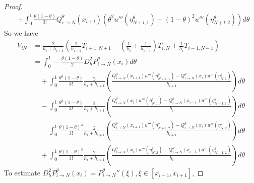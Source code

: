\documentclass[review,supplement,hidelinks,onefignum,onetabnum]{siamart220329}
\begin{document}
\begin{proof}
\begin{equation}
\begin{aligned}
              & + \int_{0}^{1} \frac{\theta (1-\theta)}{3!}{Q_{i\to N}^\theta}(x_{i+l})( \theta^2  u'''(\eta_{N+l, 1}^\theta) - (1-\theta)^2 u'''(\eta_{N+l, 2}^\theta)) d\theta
    \end{aligned}
  \end{equation}
  So we have
  \begin{equation}
    \begin{aligned}
      V_{iN} & = \frac{2}{h_{i} + h_{i+1}}  \left( \frac{1}{h_{i+1}} T_{i+1, N+1} - \left(\frac{1}{h_{i}}+\frac{1}{h_{i+1}}\right)  T_{i,N} + \frac{1}{h_{i}} T_{i-1, N-1} \right)                                                      \\
             & = \int_{0}^{1} -\frac{\theta (1-\theta)}{2} D_h^2 P_{i\to N}^\theta(x_i)  d\theta                                                                                                                                           \\
             & \quad +  \int_{0}^1 \frac{\theta^3 (1-\theta)}{3!} \frac{2}{h_{i} + h_{i+1}}\left( \frac{{Q_{i\to N}^\theta}(x_{i+1}) u'''(\eta_{N+1,1}^\theta) - {Q_{i\to N}^\theta}(x_{i}) u'''(\eta_{N,1}^\theta)}{h_{i+1}}\right)  d\theta \\
             & \quad -  \int_{0}^1 \frac{\theta^3 (1-\theta)}{3!} \frac{2}{h_{i} + h_{i+1}}\left( \frac{{Q_{i\to N}^\theta}(x_{i}) u'''(\eta_{N,1}^\theta) - {Q_{i\to N}^\theta}(x_{i-1}) u'''(\eta_{N-1,1}^\theta)}{h_{i}}\right)  d\theta   \\
             & \quad -  \int_{0}^1 \frac{\theta (1-\theta)^3}{3!} \frac{2}{h_{i} + h_{i+1}}\left( \frac{{Q_{i\to N}^\theta}(x_{i+1}) u'''(\eta_{N+1,2}^\theta) - {Q_{i\to N}^\theta}(x_{i}) u'''(\eta_{N,2}^\theta)}{h_{i+1}}\right)  d\theta \\
             & \quad +  \int_{0}^1 \frac{\theta (1-\theta)^3}{3!} \frac{2}{h_{i} + h_{i+1}}\left( \frac{{Q_{i\to N}^\theta}(x_{i}) u'''(\eta_{N,2}^\theta) - {Q_{i\to N}^\theta}(x_{i-1}) u'''(\eta_{N-1,2}^\theta)}{h_{i}}\right)  d\theta
    \end{aligned}
  \end{equation}
  To estimate \(D_h^2 P_{i\to N}^\theta(x_i)={P_{i\to N}^\theta}''(\xi), \xi \in [x_{i-1}, x_{i+1}]\),
\end{proof}





\end{document}
